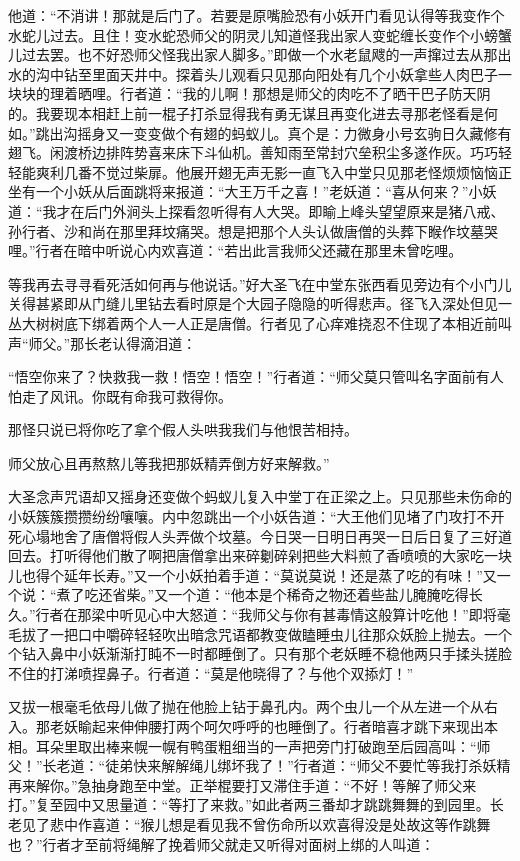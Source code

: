 \documentclass[12pt,UTF8]{ctexbook}
\begin{document}
{	他道：“不消讲！那就是后门了。若要是原嘴脸恐有小妖开门看见认得等我变作个水蛇儿过去。且住！变水蛇恐师父的阴灵儿知道怪我出家人变蛇缠长变作个小螃蟹儿过去罢。也不好恐师父怪我出家人脚多。”即做一个水老鼠飕的一声撺过去从那出水的沟中钻至里面天井中。探着头儿观看只见那向阳处有几个小妖拿些人肉巴子一块块的理着晒哩。行者道：“我的儿啊！那想是师父的肉吃不了晒干巴子防天阴的。我要现本相赶上前一棍子打杀显得我有勇无谋且再变化进去寻那老怪看是何如。”跳出沟摇身又一变变做个有翅的蚂蚁儿。真个是：力微身小号玄驹日久藏修有翅飞。闲渡桥边排阵势喜来床下斗仙机。善知雨至常封穴垒积尘多遂作灰。巧巧轻轻能爽利几番不觉过柴扉。他展开翅无声无影一直飞入中堂只见那老怪烦烦恼恼正坐有一个小妖从后面跳将来报道：“大王万千之喜！”老妖道：“喜从何来？”小妖道：“我才在后门外涧头上探看忽听得有人大哭。即睮上峰头望望原来是猪八戒、孙行者、沙和尚在那里拜坟痛哭。想是把那个人头认做唐僧的头葬下睺作坟墓哭哩。”行者在暗中听说心内欢喜道：“若出此言我师父还藏在那里未曾吃哩。
	
	等我再去寻寻看死活如何再与他说话。”好大圣飞在中堂东张西看见旁边有个小门儿关得甚紧即从门缝儿里钻去看时原是个大园子隐隐的听得悲声。径飞入深处但见一丛大树树底下绑着两个人一人正是唐僧。行者见了心痒难挠忍不住现了本相近前叫声“师父。”那长老认得滴泪道：
	
	“悟空你来了？快救我一救！悟空！悟空！”行者道：“师父莫只管叫名字面前有人怕走了风讯。你既有命我可救得你。
	
	那怪只说已将你吃了拿个假人头哄我我们与他恨苦相持。
	
	师父放心且再熬熬儿等我把那妖精弄倒方好来解救。”
	
	大圣念声咒语却又摇身还变做个蚂蚁儿复入中堂丁在正梁之上。只见那些未伤命的小妖簇簇攒攒纷纷嚷嚷。内中忽跳出一个小妖告道：“大王他们见堵了门攻打不开死心塌地舍了唐僧将假人头弄做个坟墓。今日哭一日明日再哭一日后日复了三好道回去。打听得他们散了啊把唐僧拿出来碎劖碎剁把些大料煎了香喷喷的大家吃一块儿也得个延年长寿。”又一个小妖拍着手道：“莫说莫说！还是蒸了吃的有味！”又一个说：“煮了吃还省柴。”又一个道：“他本是个稀奇之物还着些盐儿腌腌吃得长久。”行者在那梁中听见心中大怒道：“我师父与你有甚毒情这般算计吃他！”即将毫毛拔了一把口中嚼碎轻轻吹出暗念咒语都教变做瞌睡虫儿往那众妖脸上抛去。一个个钻入鼻中小妖渐渐打盹不一时都睡倒了。只有那个老妖睡不稳他两只手揉头搓脸不住的打涕喷捏鼻子。行者道：“莫是他晓得了？与他个双掭灯！”
	
	又拔一根毫毛依母儿做了抛在他脸上钻于鼻孔内。两个虫儿一个从左进一个从右入。那老妖睮起来伸伸腰打两个呵欠呼呼的也睡倒了。行者暗喜才跳下来现出本相。耳朵里取出棒来幌一幌有鸭蛋粗细当的一声把旁门打破跑至后园高叫：“师父！”长老道：“徒弟快来解解绳儿绑坏我了！”行者道：“师父不要忙等我打杀妖精再来解你。”急抽身跑至中堂。正举棍要打又滞住手道：“不好！等解了师父来打。”复至园中又思量道：“等打了来救。”如此者两三番却才跳跳舞舞的到园里。长老见了悲中作喜道：“猴儿想是看见我不曾伤命所以欢喜得没是处故这等作跳舞也？”行者才至前将绳解了挽着师父就走又听得对面树上绑的人叫道：
	
}
\end{document}
